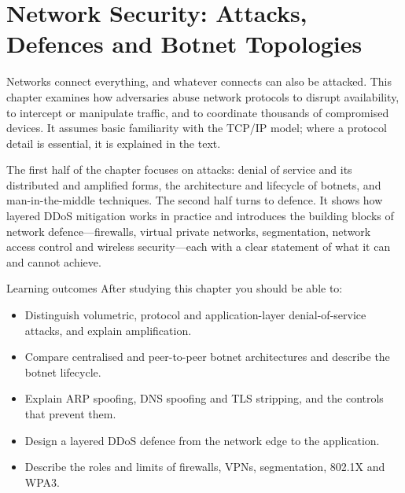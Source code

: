 \chapter{Network Security: Attacks, Defences and Botnet Topologies}\label{ch:6}

Networks connect everything, and whatever connects can also be attacked. This chapter examines how adversaries abuse network protocols to disrupt availability, to intercept or manipulate traffic, and to coordinate thousands of compromised devices. It assumes basic familiarity with the TCP/IP model; where a protocol detail is essential, it is explained in the text.

The first half of the chapter focuses on attacks: denial of service and its distributed and amplified forms, the architecture and lifecycle of botnets, and man-in-the-middle techniques. The second half turns to defence. It shows how layered DDoS mitigation works in practice and introduces the building blocks of network defence—firewalls, virtual private networks, segmentation, network access control and wireless security—each with a clear statement of what it can and cannot achieve.

\begin{outcomesbox}{Learning outcomes}
After studying this chapter you should be able to:
\begin{itemize}
  \item Distinguish volumetric, protocol and application-layer denial-of-service attacks, and explain amplification.
  \item Compare centralised and peer-to-peer botnet architectures and describe the botnet lifecycle.
  \item Explain ARP spoofing, DNS spoofing and TLS stripping, and the controls that prevent them.
  \item Design a layered DDoS defence from the network edge to the application.
  \item Describe the roles and limits of firewalls, VPNs, segmentation, 802.1X and WPA3.
\end{itemize}
\end{outcomesbox}

